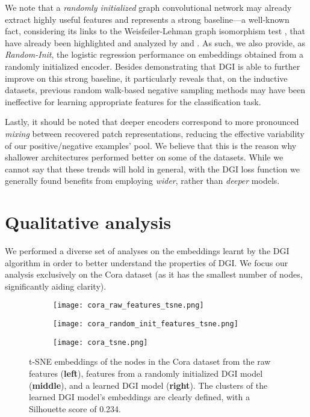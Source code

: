 \documentclass{article} \usepackage{iclr2019_conference,times}
\begin{document}
We note that a \emph{randomly initialized} graph convolutional network may already extract highly useful features and represents a strong baseline---a well-known fact, considering its links to the Weisfeiler-Lehman graph isomorphism test \citep{weisfeiler1968reduction}, that have already been highlighted and analyzed by \cite{kipf2016semi} and \cite{hamilton2017inductive}. As such, we also provide, as \emph{Random-Init}, the logistic regression performance on embeddings obtained from a randomly initialized encoder. Besides demonstrating that DGI is able to further improve on this strong baseline, it particularly reveals that, on the inductive datasets, previous random walk-based negative sampling methods may have been ineffective for learning appropriate features for the classification task.

Lastly, it should be noted that deeper encoders correspond to more pronounced \emph{mixing} between recovered patch representations, reducing the effective variability of our positive/negative examples' pool. We believe that this is the reason why shallower architectures performed better on some of the datasets. While we cannot say that these trends will hold in general, with the DGI loss function we generally found benefits from employing \emph{wider}, rather than \emph{deeper} models.

\section{Qualitative analysis}
We performed a diverse set of analyses on the embeddings learnt by the DGI algorithm in order to better understand the properties of DGI. We focus our analysis exclusively on the Cora dataset (as it has the smallest number of nodes, significantly aiding clarity).

\begin{figure}
\centering
\begin{subfigure}{0.33\textwidth}
  \centering
  \texttt{[image: cora\_raw\_features\_tsne.png]}
\end{subfigure}\begin{subfigure}{0.33\textwidth}
  \centering
  \texttt{[image: cora\_random\_init\_features\_tsne.png]}
\end{subfigure}\begin{subfigure}{0.33\textwidth}
  \centering
  \texttt{[image: cora\_tsne.png]}
\end{subfigure}
\caption{t-SNE embeddings of the nodes in the Cora dataset from the raw features ({\bf left}), features from a randomly initialized DGI model ({\bf middle}), and a learned DGI model ({\bf right}). The clusters of the learned DGI model's embeddings are clearly defined, with a Silhouette score of 0.234.}
\label{fig:cora_raw_and_random_features}
\end{figure}
\end{document}
